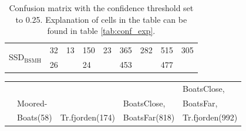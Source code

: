 \begin{table}[h!]
\begin{tabular}{l|ll|ll|ll|ll}
\multirow{2}{*}{SSD$_{\text{BSMH}}$}  & 32            & 13           & 150            & 23            & 365            & 282            & 515              & 305             \\
                       & 26            &              & 24             &               & 453            &                & 477              &                
\end{tabular}
\caption{Confusion matrix with the confidence threshold set to 0.25. Explanation of cells in the table can be found in table \ref{tab:conf_exp}.}
\label{tab:conf_025}
\end{table}


\begin{table}[h!]
\centering
\begin{tabular}{l|ll|ll|ll|ll}
                       & \multicolumn{2}{l|}{} & \multicolumn{2}{l|}{} & \multicolumn{2}{l|}{} & \multicolumn{2}{l}{BoatsClose,} \\ 
                       
                       & \multicolumn{2}{l|}{Moored-} & \multicolumn{2}{l|}{} & \multicolumn{2}{l|}{BoatsClose,} & \multicolumn{2}{l}{BoatsFar,} \\ 

                       & \multicolumn{2}{l|}{Boats(58)} & \multicolumn{2}{l|}{Tr.fjorden(174)} & \multicolumn{2}{l|}{BoatsFar(818)} & \multicolumn{2}{l}{Tr.fjorden(992)} \\
                       

\end{tabular}
\end{table}
